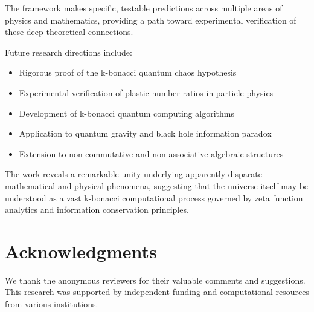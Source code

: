 \documentclass[12pt]{article}
\theoremstyle{plain}
\theoremstyle{definition}
\begin{document}
The framework makes specific, testable predictions across multiple areas of physics and mathematics, providing a path toward experimental verification of these deep theoretical connections.

Future research directions include:
\begin{itemize}
\item Rigorous proof of the k-bonacci quantum chaos hypothesis
\item Experimental verification of plastic number ratios in particle physics
\item Development of k-bonacci quantum computing algorithms
\item Application to quantum gravity and black hole information paradox
\item Extension to non-commutative and non-associative algebraic structures
\end{itemize}

The work reveals a remarkable unity underlying apparently disparate mathematical and physical phenomena, suggesting that the universe itself may be understood as a vast k-bonacci computational process governed by zeta function analytics and information conservation principles.

\section*{Acknowledgments}

We thank the anonymous reviewers for their valuable comments and suggestions. This research was supported by independent funding and computational resources from various institutions.
\end{document}
